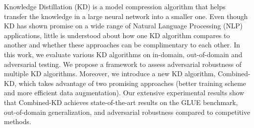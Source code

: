 Knowledge Distillation (KD) is a model compression algorithm that helps transfer the knowledge in a large neural network into a smaller one. Even though KD has shown promise on a wide range of Natural Language Processing (NLP) applications, little is understood about how one KD algorithm compares to another and whether these approaches can be complimentary to each other. In this work, we evaluate various KD algorithms on in-domain, out-of-domain and adversarial testing. We propose a framework to assess adversarial robustness of multiple KD algorithms. Moreover, we introduce a new KD algorithm, Combined-KD, which takes advantage of two promising approaches (better training scheme and more efficient data augmentation). Our extensive experimental results show that Combined-KD achieves  state-of-the-art results on the GLUE benchmark, out-of-domain generalization, and adversarial robustness compared to competitive methods.
